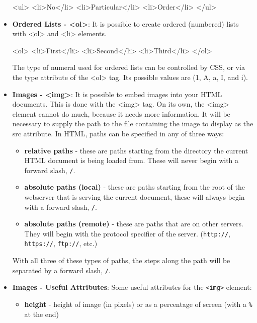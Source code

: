 \documentclass{report}
\begin{document}
\begin{itemize}
\begin{htmlcode}
            <ul>
                <li>No</li>
                <li>Particular</li>
                <li>Order</li>
            </ul>
        \end{htmlcode}
    \item \textbf{Ordered Lists - <ol>}: It is possible to create ordered (numbered) lists with <ol> and <li> elements.
        \bigbreak \noindent 
        \begin{htmlcode}
            <ol>
                <li>First</li>
                <li>Second</li>
                <li>Third</li>
            </ol>
        \end{htmlcode}
        \bigbreak \noindent 
        The type of numeral used for ordered lists can be controlled by CSS, or via the type attribute of the <ol> tag. Its possible values are (1, A, a, I, and i).
    \item \textbf{Images - <img>}: It is possible to embed images into your HTML documents. This is done with the <img> tag. On its own, the <img>
        element cannot do much, because it needs more information. It will be necessary to supply the path to the file
        containing the image to display as the src attribute.
        \bigbreak \noindent 
        In HTML, paths can be specified in any of three ways:
        \begin{itemize}
            \item \textbf{relative paths} - these are paths starting from the directory the current HTML document is being loaded from. These will never begin with a forward slash, \texttt{/}.
            \item \textbf{absolute paths (local)} - these are paths starting from the root of the webserver that is serving the current document, these will always begin with a forward slash, \texttt{/}.
            \item \textbf{absolute paths (remote)} - these are paths that are on other servers. They will begin with the protocol specifier of the server. (\texttt{http://}, \texttt{https://}, \texttt{ftp://}, etc.)
        \end{itemize}
        With all three of these types of paths, the steps along the path will be separated by a forward slash, \texttt{/}.
    \item \textbf{Images - Useful Attributes}: Some useful attributes for the \texttt{<img>} element:
        \begin{itemize}
            \item \textbf{height} - height of image (in pixels) or as a percentage of screen (with a \texttt{\%} at the end)

\end{itemize}
\end{itemize}
\end{document}
